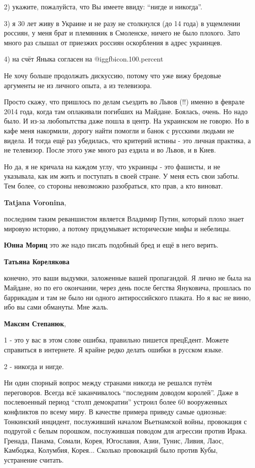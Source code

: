 \begin{itemize}
\begin{itemize}
2) укажите, пожалуйста, что Вы имеете ввиду: \enquote{нигде и никогда}.

3) я 30 лет живу в Украине и не разу не столкнулся (до 14 года) в ущемлении
россиян, у меня брат и племянник в Смоленске, ничего не было плохого. Зато
много раз слышал от приезжих россиян оскорбления в адрес украинцев.

4) на счёт Яныка согласен на  @igg{fbicon.100.percent} 


Не хочу больше продолжать дискуссию, потому что уже вижу бредовые аргументы не
из личного опыта, а из телевизора.

Просто скажу, что пришлось по делам съездить во Львов (!!) именно в феврале
2014 года, когда там оплакивали погибших на Майдане. Боялась, очень. Но надо
было. И из-за любопытства даже пошла в центр. На украинском не говорю. Но в
кафе меня накормили, дорогу найти помогли и банок с русскими людьми не видела.
И тогда ещё раз убедилась, что критерий истины - это личная практика, а не
телевизор. После этого уже много раз ездила и во Львов, и в Киев.

Но да, я не кричала на каждом углу, что украинцы - это фашисты, и не указывала,
как им жить и поступать в своей стране. У меня есть свои заботы. Тем более, со
стороны невозможно разобраться, кто прав, а кто виноват.

\textbf{Tatjana Voronina}, 

последним таким реваншистом является Владимир Путин, который плохо знает
мировую историю, а потому придумывает исторические мифы и небелицы.

\textbf{Юнна Мориц} это же надо писать подобный бред и ещё в него верить.

\textbf{Татьяна Корелякова} 

конечно, это ваши выдумки, заложенные вашей пропагандой. Я лично не была на
Майдане, но по его окончании, через день после бегства Януковича, прошлась по
баррикадам и там не было ни одного антироссийского плаката. Но я вас не виню,
ибо вы сами обмануты. Мне жаль.

\textbf{Максим Степанюк},

1 - это у вас в этом слове ошибка, правильно пишется прецЕдент. Можете
справиться в интернете. Я крайне редко делать ошибки в русском языке.

2 - никогда и нигде.

Ни один спорный вопрос между странами никогда не решался путём переговоров.
Всегда всё заканчивалось \enquote{последним доводом королей}. Даже в послевоенный
период \enquote{столп демократии} устроил более 60 вооруженных конфликтов по всему
миру. В качестве примера приведу самые одиозные: Тонкинский инцидент,
послуживший началом Вьетнамской войны, провокация с подругой с белым порошком,
послужившая поводом для агрессии против Ирака. Гренада, Панама, Сомали, Корея,
Югославия, Азии, Тунис, Ливия, Лаос, Камбоджа, Колумбия, Корея... Сколько
провокаций было против Кубы, устранение считать.


\end{itemize}
\end{itemize}
